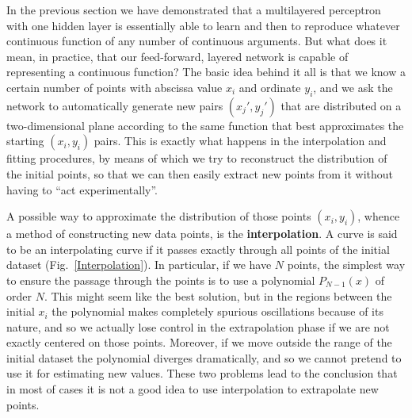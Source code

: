 In the previous section we have demonstrated that a multilayered perceptron with one hidden layer is essentially able to learn and then to reproduce whatever continuous function of any number of continuous arguments. But what does it mean, in practice, that our feed-forward, layered network is capable of representing a continuous function? The basic idea behind it all is that we know a certain number of points with abscissa value $x_i$ and ordinate $y_i$, and we ask the network to automatically generate new pairs $(x_j',y_j')$ that are distributed on a two-dimensional plane according to the same function that best approximates the starting $(x_i,y_i)$ pairs. This is exactly what happens in the interpolation and fitting procedures, by means of which we try to reconstruct the distribution of the initial points, so that we can then easily extract new points from it without having to ``act experimentally''.

A possible way to approximate the distribution of those points $(x_i,y_i)$, whence a method of constructing new data points, is the \textbf{interpolation}. A curve is said to be an interpolating curve if it passes exactly through all points of the initial dataset (Fig.~\ref{Interpolation}). In particular, if we have $N$ points, the simplest way to ensure the passage through the points is to use a polynomial $P_{N-1}(x)$ of order $N$. This might seem like the best solution, but in the regions between the initial $x_i$ the polynomial makes completely spurious oscillations because of its nature, and so we actually lose control in the extrapolation phase if we are not exactly centered on those points. Moreover, if we move outside the range of the initial dataset the polynomial diverges dramatically, and so we cannot pretend to use it for estimating new values. These two problems lead to the conclusion that in most of cases it is not a good idea to use interpolation to extrapolate new points.

